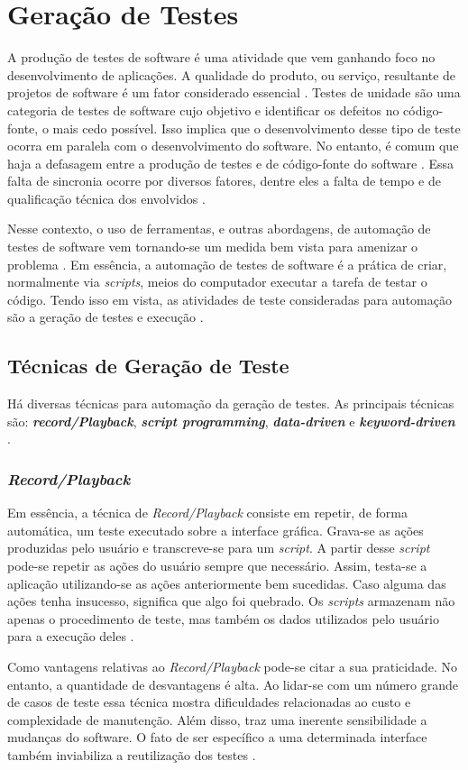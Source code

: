 \section{Geração de Testes}
A produção de testes de software é uma atividade que vem ganhando foco no desenvolvimento de aplicações. A qualidade do produto, ou serviço, resultante de projetos de software é um fator considerado essencial \cite{barbosaEtAl2009}. Testes de unidade são uma categoria de testes de software cujo objetivo e identificar os defeitos no código-fonte, o mais cedo possível. Isso implica que o desenvolvimento desse tipo de teste ocorra em paralela com o desenvolvimento do software. No entanto, é comum que haja a defasagem entre a produção de testes e de código-fonte do software \cite{fantinatoEtAl2004}. Essa falta de sincronia ocorre por diversos fatores, dentre eles a falta de tempo e de qualificação técnica dos envolvidos \cite{fantinatoEtAl2004}.
\par
\indent Nesse contexto, o uso de ferramentas, e outras abordagens, de automação de testes de software vem tornando-se um medida bem vista para amenizar o problema \cite{fantinatoEtAl2004}. Em essência, a automação de testes de software é a prática de criar, normalmente via \textit{scripts}, meios do computador executar a tarefa de testar o código. Tendo isso em vista, as atividades de teste consideradas para automação são a geração de testes e execução \cite{fantinatoEtAl2004}.

\subsection{Técnicas de Geração de Teste}
Há diversas técnicas para automação da geração de testes. As principais técnicas são: \textbf{\textit{record/Playback}}, \textbf{\textit{script programming}}, \textbf{\textit{data-driven}} e \textbf{\textit{keyword-driven}} \cite{fantinatoEtAl2004}.
\subsubsection{\textit{Record/Playback}}
Em essência, a técnica de \textit{Record/Playback} consiste em repetir, de forma automática, um teste executado sobre a interface gráfica. Grava-se as ações produzidas pelo usuário e transcreve-se para um \textit{script}. A partir desse \textit{script} pode-se repetir as ações do usuário sempre que necessário. Assim, testa-se a aplicação utilizando-se as ações anteriormente bem sucedidas. Caso alguma das ações tenha insucesso, significa que algo foi quebrado. Os \textit{scripts} armazenam não apenas o procedimento de teste, mas também os dados utilizados pelo usuário para a execução deles \cite{kent2007}.
\par
\indent Como vantagens relativas ao \textit{Record/Playback} pode-se citar a sua praticidade. No entanto, a quantidade de desvantagens é alta. Ao lidar-se com um número grande de casos de teste essa técnica mostra dificuldades relacionadas ao custo e complexidade de manutenção. Além disso, traz uma inerente sensibilidade a mudanças do software. O fato de ser específico a uma determinada interface também inviabiliza a reutilização dos testes \cite{fantinatoEtAl2004}.
